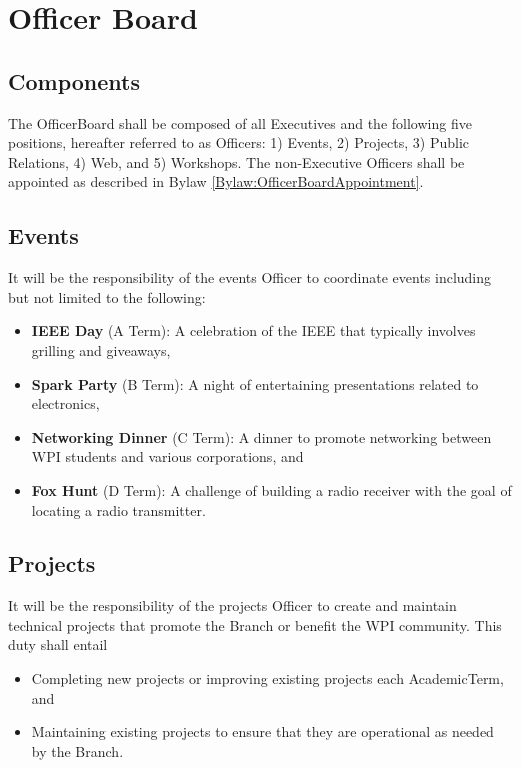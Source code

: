 \chapter{Officer Board}\label{Bylaw:OfficerBoard}

\section{Components}\label{Bylaw:OfficerBoard:Components}
    The \gls{OfficerBoard} shall be composed of all \glspl{Executive} and the following five positions, hereafter referred to as \glspl{Officer}: 1) Events, 2) Projects, 3) Public Relations, 4) Web, and 5) Workshops. The non-\gls{Executive} \glspl{Officer} shall be appointed as described in Bylaw \ref{Bylaw:OfficerBoardAppointment}.

\section{Events}\label{Bylaw:OfficerBoard:Events}
    It will be the responsibility of the events \gls{Officer} to coordinate events including but not limited to the following:
    \begin{itemize}
        \item{\textbf{\gls{IEEE} Day} (A Term): A celebration of the \gls{IEEE} that typically involves grilling and giveaways,}
        \item{\textbf{Spark Party} (B Term): A night of entertaining presentations related to electronics,} 
        \item{\textbf{Networking Dinner} (C Term): A dinner to promote networking between \gls{WPI} students and various corporations, and}
        \item{\textbf{Fox Hunt} (D Term): A challenge of building a radio receiver with the goal of locating a radio transmitter.}
    \end{itemize}

\section{Projects}\label{Bylaw:OfficerBoard:Projects}
    It will be the responsibility of the projects \gls{Officer} to create and maintain technical projects that promote the \gls{Branch} or benefit the \gls{WPI} community. This duty shall entail
    \begin{itemize}
        \item{Completing new projects or improving existing projects each \gls{AcademicTerm}, and}
        \item{Maintaining existing projects to ensure that they are operational as needed by the \gls{Branch}.}
    \end{itemize}

